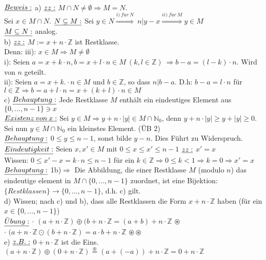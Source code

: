 \documentclass[fleqn, a4paper, 11pt]{article}
\begin{document}
\\
$\uline{Beweis:}$ a) $\uline{zz:}$ $M\cap N\neq\emptyset\Rightarrow M=N$.\\
Sei $x\in M\cap N$. $\uline{N\subseteq M:}$ Sei $y\in N\stackrel{i)\:f\ddot{u}r\:N}{\Rightarrow}\:n|y-x\stackrel{ii)\:f\ddot{u}r\:M}{\Rightarrow} y\in M$\\
$\uline{M\subseteq N:}$ analog.\\
b) $\uline{zz:}$ $M:=x+n\cdot\mathbb{Z}$ ist Restklasse.\\
Denn: iii): $x\in M\Rightarrow M\neq\emptyset$\\
i): Seien $a=x+k\cdot n,b=x+l\cdot n\in M\:(k,l\in\mathbb{Z})\:\Rightarrow b-a=(l-k)\cdot n$. Wird von $n$ geteilt.\\
ii): Seien $a=x+k.\cdot n\in M$ und $b\in\mathbb{Z}$, so dass $n|b-a$. D.h: $b-a=l\cdot n$ f\"ur $l\in\mathbb{Z}\Rightarrow b=a+l\cdot n=x+(k+l)\cdot n\in M$\\
c) $\uline{Behauptung:}$ Jede Restklasse $M$ enth\"alt ein eindeutiges Element aus $\{0,...,n-1\}\ni x$\\
$\uline{Existenz\:von\:x:}$ Sei $y\in M\Rightarrow y+n\cdot |y|\in M\cap\mathbb{N}_{0}$, denn $y+n\cdot |y|\geq y+|y|\geq0$. Sei nun $y\in M\cap\mathbb{N}_{0}$ ein kleinstes Element. (\"UB 2)\\
$\uline{Behauptung:}$ $0\leq y\leq n-1$, sonst bilde $y-n$. Dies F\"uhrt zu Widerspruch.\\
$\uline{Eindeutigkeit:}$ Seien $x,x'\in M$ mit $0\leq x\leq x'\leq n-1$ $\uline{zz:}$ $x'=x$\\
Wissen: $0\leq x'-x=k\cdot n\leq n-1$ f\"ur ein $k\in\mathbb{Z}\Rightarrow 0\leq k<1\Rightarrow k=0\Rightarrow x'=x$\\
$\uline{Behauptung:}$  1b)$\Rightarrow$ Die Abbildung, die einer Restklasse $M$ (modulo $n$) das eindeutige element in $M\cap\{0,...,n-1\}$ zuordnet, ist eine Bijektion: $\{Restklassen\}\rightarrow\{0,...,n-1\}$, d.h. c) gilt.\\
d) Wissen; nach c) und b), dass alle Restklassen die Form $x+n\cdot\mathbb{Z}$ haben (f\"ur ein $x\in\{0,...,n-1\}$)\\
$\uline{\ddot{U}bung:}$ $\cdot$ $(a+n\cdot\mathbb{Z})\oplus(b+n\cdot\mathbb{Z}=(a+b)+n\cdot\mathbb{Z}$ $\circledast$\\
$\cdot$ $(a+n\cdot\mathbb{Z}\odot(b+n\cdot\mathbb{Z})=a\cdot b+n\cdot\mathbb{Z}$ $\circledast\circledast$\\
e) $\uline{z.B.:}$ $0+n\cdot\mathbb{Z}$ ist die Eins. $(a+n\cdot\mathbb{Z})\oplus(0+n\cdot\mathbb{Z})\stackrel{\circledast}{=}(a+(-a))+n\cdot\mathbb{Z}=0+n\cdot\mathbb{Z}$\\
\end{document}
